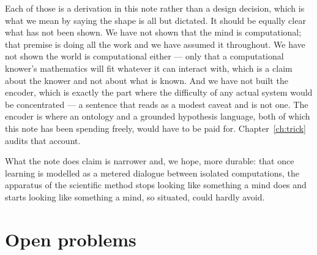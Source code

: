 Each of those is a derivation in this note rather than a design decision, which is what we mean by
saying the shape is all but dictated. It should be equally clear what has not been shown. We have not
shown that the mind is computational; that premise is doing all the work and we have assumed it
throughout. We have not shown the world is computational either --- only that a computational knower's
mathematics will fit whatever it can interact with, which is a claim about the knower and not about
what is known. And we have not built the encoder, which is exactly the part where the difficulty of
any actual system would be concentrated --- a sentence that reads as a modest caveat and is not one. The
encoder is where an ontology and a grounded hypothesis language, both of which this note has been
spending freely, would have to be paid for. Chapter~\ref{ch:trick} audits that account.

What the note does claim is narrower and, we hope, more durable: that once learning is modelled as a
metered dialogue between isolated computations, the apparatus of the scientific method stops looking
like something a mind does and starts looking like something a mind, so situated, could hardly avoid.

\section{Open problems}\label{sci:S18}
\label{sci:sec:open}

